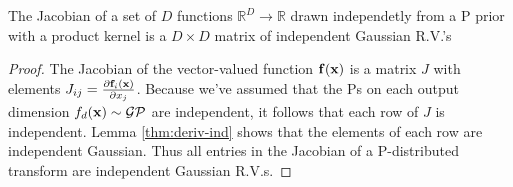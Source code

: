 \documentclass[twoside]{article}
\makeatletter
\newcommand{\Jx}{J_{\vx \rightarrow \vy}}
\newcommand{\Jxx}{J_{\vx \rightarrow \vy}(\vx)}
\newcommand{\Jy}{J_{\vy \rightarrow \vx}}
\newlength{\nonHumbleHeight}
\def\@humbleformat#1{{\settoheight{\nonHumbleHeight}{#1}\resizebox{!}{0.94\nonHumbleHeight}{#1}}}%
\def\humble#1{\@humbleformat{#1}}%
\newcommand{\gp}{{\humble GP}}
\makeatother
\begin{document}
\begin{lemma}
\label{thm:matrix}
The Jacobian of a set of $D$ functions $\mathbb{R}^D \rightarrow \mathbb{R}$ drawn independetly from a \gp{} prior with a product kernel is a $D \times D$ matrix of independent Gaussian R.V.'s
\end{lemma}
%
\begin{proof}
The Jacobian of the vector-valued function ${\bf{f}}({\bf{x}})$ is a matrix $J$ with elements ${J_{ij} = \frac{ \partial {\bf{f}}_i ({\bf{x}}) }{\partial x_j}}$.
%
%
%
Because we've assumed that the \gp{}s on each output dimension $f_d({\bf{x}}) \sim \mathcal{GP}$ are independent, it follows that each row of $J$ is independent.
Lemma \ref{thm:deriv-ind} shows that the elements of each row are independent Gaussian.
Thus all entries in the Jacobian of a \gp{}-distributed transform are independent Gaussian R.V.s.
\end{proof}

\end{document}
